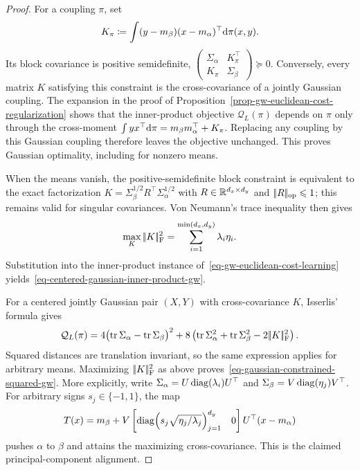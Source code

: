 \begin{proof}
	For a coupling $\pi$, set
	\[
		K_\pi
		\coloneqq
		\int (y-m_\beta)(x-m_\alpha)^\top\mathrm{d}\pi(x,y).
	\]
	Its block covariance is positive semidefinite,
	$\left(\begin{smallmatrix}\Sigma_\alpha&K_\pi^\top\\K_\pi&\Sigma_\beta\end{smallmatrix}\right)\succeq0$.
	Conversely, every matrix $K$ satisfying this constraint is the cross-covariance of a jointly Gaussian coupling. The expansion in the proof of Proposition~\ref{prop-gw-euclidean-cost-regularization} shows that the inner-product objective $\mathcal Q_L(\pi)$ depends on $\pi$ only through the cross-moment
	$\int yx^\top\mathrm{d}\pi=m_\beta m_\alpha^\top+K_\pi$. Replacing any coupling by this Gaussian coupling therefore leaves the objective unchanged. This proves Gaussian optimality, including for nonzero means.

	When the means vanish, the positive-semidefinite block constraint is equivalent to the exact factorization
	$K=\Sigma_\beta^{1/2}R^\top\Sigma_\alpha^{1/2}$ with
	$R\in\mathbb{R}^{d_x\times d_y}$ and $|\!| R |\!|_{\mathrm{op}}\leqslant1$; this remains valid for singular covariances. Von Neumann's trace inequality then gives
	\[
		\max_K|\!| K |\!|_{\mathrm F}^2
		=
		\sum_{i=1}^{\min(d_x,d_y)}\lambda_i\eta_i.
	\]
	Substitution into the inner-product instance of~\eqref{eq-gw-euclidean-cost-learning} yields~\eqref{eq-centered-gaussian-inner-product-gw}.

	For a centered jointly Gaussian pair $(X,Y)$ with cross-covariance $K$, Isserlis' formula gives
	\[
		\mathcal Q_L(\pi)
		=
		4\bigl(\operatorname{tr}\Sigma_\alpha-\operatorname{tr}\Sigma_\beta\bigr)^2
		+8\left(\operatorname{tr}\Sigma_\alpha^2+\operatorname{tr}\Sigma_\beta^2-2|\!| K |\!|_{\mathrm F}^2\right).
	\]
	Squared distances are translation invariant, so the same expression applies for arbitrary means. Maximizing $|\!| K |\!|_{\mathrm F}^2$ as above proves~\eqref{eq-gaussian-constrained-squared-gw}. More explicitly, write
	$\Sigma_\alpha=U\operatorname{diag}(\lambda_i)U^\top$ and
	$\Sigma_\beta=V\operatorname{diag}(\eta_j)V^\top$. For arbitrary signs $s_j\in\{-1,1\}$, the map
	\[
		T(x)
		=
		m_\beta+V
		\begin{bmatrix}
			\operatorname{diag}\!\left(s_j\sqrt{\eta_j/\lambda_j}\right)_{j=1}^{d_y}&0
		\end{bmatrix}
		U^\top(x-m_\alpha)
	\]
	pushes $\alpha$ to $\beta$ and attains the maximizing cross-covariance. This is the claimed principal-component alignment.
\end{proof}


